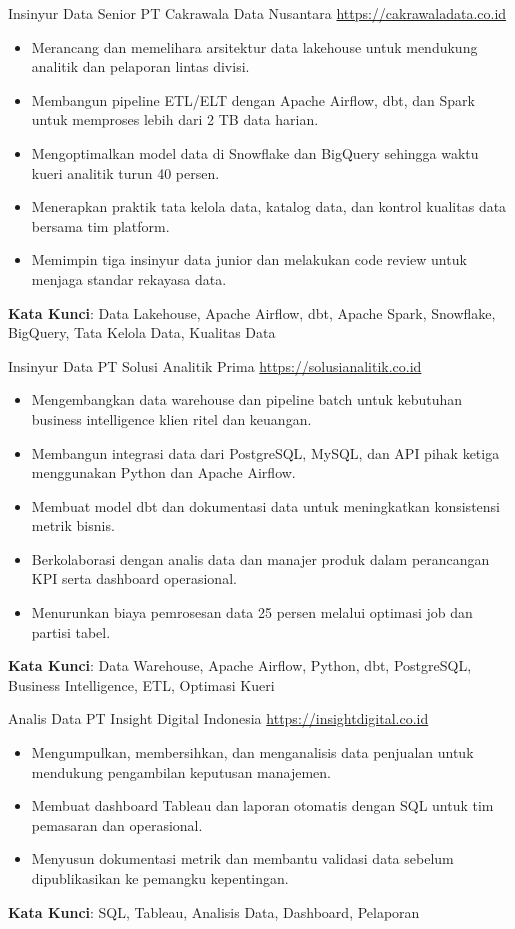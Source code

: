 \documentclass[a4paper, serif, 10pt]{moderncv}
\begin{document}
        {Insinyur Data Senior}
        {PT Cakrawala Data Nusantara}
        {\url{https://cakrawaladata.co.id}}
        {}
        {\begin{itemize}
\item Merancang dan memelihara arsitektur data lakehouse untuk mendukung analitik dan pelaporan lintas divisi.
\item Membangun pipeline ETL/ELT dengan Apache Airflow, dbt, dan Spark untuk memproses lebih dari 2 TB data harian.
\item Mengoptimalkan model data di Snowflake dan BigQuery sehingga waktu kueri analitik turun 40 persen.
\item Menerapkan praktik tata kelola data, katalog data, dan kontrol kualitas data bersama tim platform.
\item Memimpin tiga insinyur data junior dan melakukan code review untuk menjaga standar rekayasa data.
\end{itemize}
\textbf{Kata Kunci}: Data Lakehouse, Apache Airflow, dbt, Apache Spark, Snowflake, BigQuery, Tata Kelola Data, Kualitas Data}

        {Insinyur Data}
        {PT Solusi Analitik Prima}
        {\url{https://solusianalitik.co.id}}
        {}
        {\begin{itemize}
\item Mengembangkan data warehouse dan pipeline batch untuk kebutuhan business intelligence klien ritel dan keuangan.
\item Membangun integrasi data dari PostgreSQL, MySQL, dan API pihak ketiga menggunakan Python dan Apache Airflow.
\item Membuat model dbt dan dokumentasi data untuk meningkatkan konsistensi metrik bisnis.
\item Berkolaborasi dengan analis data dan manajer produk dalam perancangan KPI serta dashboard operasional.
\item Menurunkan biaya pemrosesan data 25 persen melalui optimasi job dan partisi tabel.
\end{itemize}
\textbf{Kata Kunci}: Data Warehouse, Apache Airflow, Python, dbt, PostgreSQL, Business Intelligence, ETL, Optimasi Kueri}

        {Analis Data}
        {PT Insight Digital Indonesia}
        {\url{https://insightdigital.co.id}}
        {}
        {\begin{itemize}
\item Mengumpulkan, membersihkan, dan menganalisis data penjualan untuk mendukung pengambilan keputusan manajemen.
\item Membuat dashboard Tableau dan laporan otomatis dengan SQL untuk tim pemasaran dan operasional.
\item Menyusun dokumentasi metrik dan membantu validasi data sebelum dipublikasikan ke pemangku kepentingan.
\end{itemize}
\textbf{Kata Kunci}: SQL, Tableau, Analisis Data, Dashboard, Pelaporan}
\end{document}
